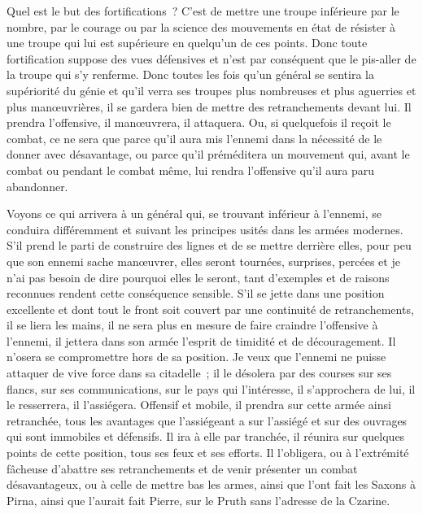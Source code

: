 \documentclass[french,twoside]{book} %
\begin{document}
Quel est le but des fortifications ? C’est de mettre une troupe inférieure par le nombre, par le courage ou par la science des mouvements en état de résister à une troupe qui lui est supérieure en quelqu’un de ces points. Donc toute fortification suppose des vues défensives et n’est par conséquent que le pis-aller de la troupe qui s’y renferme. Donc toutes les fois qu’un général se sentira la supériorité du génie et qu’il verra ses troupes plus nombreuses et plus aguerries et plus manœuvrières, il se gardera bien de mettre des retranchements devant lui. Il prendra l’offensive, il manœuvrera, il attaquera. Ou, si quelquefois il reçoit le combat, ce ne sera que parce qu’il aura mis l’ennemi dans la nécessité de le donner avec désavantage, ou parce qu’il préméditera un mouvement qui, avant le combat ou pendant le combat même, lui rendra l’offensive qu’il aura paru abandonner.\par
Voyons ce qui arrivera à un général qui, se trouvant inférieur à l’ennemi, se conduira différemment et suivant les principes usités dans les armées modernes. S’il prend le parti de construire des lignes et de se mettre derrière elles, pour peu que son ennemi sache manœuvrer, elles seront tournées, surprises, percées et je n’ai pas besoin de dire pourquoi elles le seront, tant d’exemples et de raisons reconnues rendent cette conséquence sensible. S’il se jette dans une position excellente et dont tout le front soit couvert par une continuité de retranchements, il se liera les mains, il ne sera plus en mesure de faire craindre l’offensive à l’ennemi, il jettera dans son armée l’esprit de timidité et de découragement. Il n’osera se compromettre hors de sa position. Je veux que l’ennemi ne puisse attaquer de vive force dans sa citadelle ; il le désolera par des courses sur ses flancs, sur ses communications, sur le pays qui l’intéresse, il s’approchera de lui, il le resserrera, il l’assiégera. Offensif et mobile, il prendra sur cette armée ainsi retranchée, tous les avantages que l’assiégeant a sur l’assiégé et sur des ouvrages qui sont immobiles et défensifs. Il ira à elle par tranchée, il réunira sur quelques points de cette position, tous ses feux et ses efforts. Il l’obligera, ou à l’extrémité fâcheuse d’abattre ses retranchements et de venir présenter un combat désavantageux, ou à celle de mettre bas les armes, ainsi que l’ont fait les Saxons à Pirna, ainsi que l’aurait fait Pierre, sur le Pruth sans l’adresse de la Czarine.\par
\end{document}
